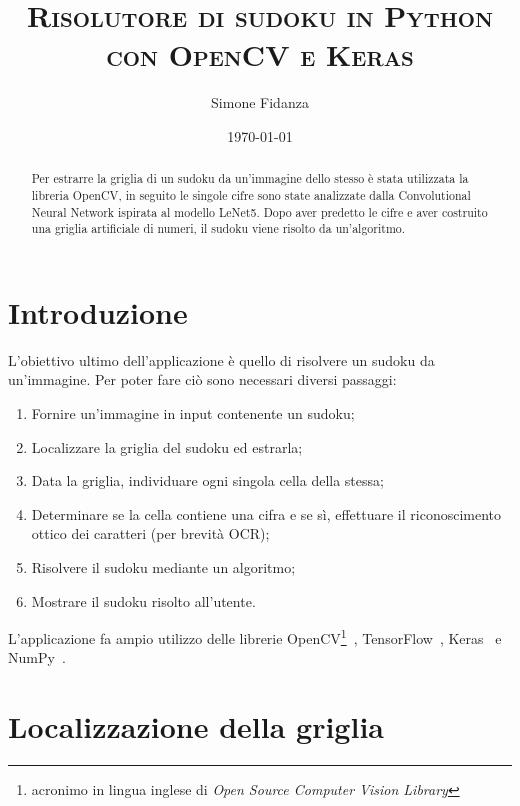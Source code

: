 \documentclass[a4paper, 10pt]{article}
\begin{document}
\title{\textsc{Risolutore di sudoku in Python con OpenCV e Keras}}
\author{Simone Fidanza}
\date{\today}


\maketitle

\begin{abstract}
    Per estrarre la griglia di un sudoku da un'immagine dello stesso è stata
    utilizzata la libreria OpenCV, in seguito le singole cifre sono state
    analizzate dalla Convolutional Neural Network ispirata al modello LeNet5.
    Dopo aver predetto le cifre e aver costruito una griglia artificiale di
    numeri, il sudoku viene risolto da un'algoritmo.
\end{abstract}


\section{Introduzione}\label{sec:introduzione}

L'obiettivo ultimo dell'applicazione è quello di risolvere un sudoku da
un'immagine. Per poter fare ciò sono necessari diversi passaggi:

\begin{enumerate}
    \item Fornire un'immagine in input contenente un sudoku;
    \item Localizzare la griglia del sudoku ed estrarla;
    \item Data la griglia, individuare ogni singola cella della stessa;
    \item Determinare se la cella contiene una cifra e se sì, effettuare il
        riconoscimento ottico dei caratteri (per brevità OCR);
    \item Risolvere il sudoku mediante un algoritmo;
    \item Mostrare il sudoku risolto all'utente.
\end{enumerate}

L'applicazione fa ampio utilizzo delle librerie OpenCV\footnote{acronimo in
lingua inglese di \emph{Open Source Computer Vision Library}
}~\cite{opencv_library}, TensorFlow~\cite{tensorflow2015-whitepaper},
Keras~\cite{chollet2015keras} e NumPy~\cite{harris2020array}.


\section{Localizzazione della griglia}
\end{document}
